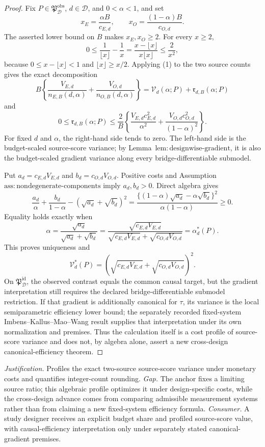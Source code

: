 \documentclass{article}
\begin{document}
\begin{proof}
Fix \(P\in\mathfrak P_{\mathcal D}^{\mathrm{obs}}\), \(d\in\mathcal D\), and \(0<\alpha<1\), and set
\[
 x_E=\frac{\alpha B}{c_{E,d}},\qquad
 x_O=\frac{(1-\alpha)B}{c_{O,d}}.
\]
The asserted lower bound on \(B\) makes \(x_E,x_O\ge2\). For every \(x\ge2\),
\[
 0\le \frac1{\lfloor x\rfloor}-\frac1x
 =\frac{x-\lfloor x\rfloor}{x\lfloor x\rfloor}
 \le\frac2{x^2}, \tag{1}
\]
because \(0\le x-\lfloor x\rfloor<1\) and \(\lfloor x\rfloor\ge x/2\). Applying (1) to the two source counts gives the exact decomposition
\[
 B\left\{\frac{V_{E,d}}{n_{E,B}(d,\alpha)}
 +\frac{V_{O,d}}{n_{O,B}(d,\alpha)}\right\}
 =\mathcal V_d(\alpha;P)+\mathfrak r_{d,B}(\alpha;P)
\]
and
\[
 0\le\mathfrak r_{d,B}(\alpha;P)
 \le\frac2B\left\{
 \frac{V_{E,d}c_{E,d}^2}{\alpha^2}
 +\frac{V_{O,d}c_{O,d}^2}{(1-\alpha)^2}\right\}. \tag{2}
\]
For fixed \(d\) and \(\alpha\), the right-hand side tends to zero. The left-hand side is the budget-scaled source-score variance; by Lemma~\(\mathrm{lem{:}designwise\text{-}gradient}\), it is also the budget-scaled gradient variance along every bridge-differentiable submodel.

Put \(a_d=c_{E,d}V_{E,d}\) and \(b_d=c_{O,d}V_{O,d}\). Positive costs and Assumption~\(\mathrm{ass{:}nondegenerate\text{-}components}\) imply \(a_d,b_d>0\). Direct algebra gives
\[
 \frac{a_d}{\alpha}+\frac{b_d}{1-\alpha}
 -(\sqrt{a_d}+\sqrt{b_d})^2
 =\frac{\{(1-\alpha)\sqrt{a_d}-\alpha\sqrt{b_d}\}^2}
 {\alpha(1-\alpha)}\ge0. \tag{3}
\]
Equality holds exactly when
\[
 \alpha=\frac{\sqrt{a_d}}{\sqrt{a_d}+\sqrt{b_d}}
 =\frac{\sqrt{c_{E,d}V_{E,d}}}
 {\sqrt{c_{E,d}V_{E,d}}+\sqrt{c_{O,d}V_{O,d}}}
 =\alpha_d^*(P).
\]
This proves uniqueness and
\[
 \mathcal V_d^*(P)
 =(\sqrt{c_{E,d}V_{E,d}}+\sqrt{c_{O,d}V_{O,d}})^2.
\]
On \(\mathfrak P_{\mathcal D}^{\mathrm{id}}\), the observed contrast equals the common causal target, but the gradient interpretation still requires the declared bridge-differentiable submodel restriction. If that gradient is additionally canonical for \(\tau\), its variance is the local semiparametric efficiency lower bound; the separately recorded fixed-system Imbens--Kallus--Mao--Wang result supplies that interpretation under its own normalization and premises. Thus the calculation itself is a cost profile of source-score variance and does not, by algebra alone, assert a new cross-design canonical-efficiency theorem.
\end{proof}
\par\smallskip\noindent \textit{Justification.} Profiles the exact two-source source-score variance under monetary costs and quantifies integer-count rounding. \textit{Gap.} The anchor fixes a limiting source ratio; this algebraic profile optimizes it under design-specific costs, while the cross-design advance comes from comparing admissible measurement systems rather than from claiming a new fixed-system efficiency formula. \textit{Consumer.} A study designer receives an explicit budget share and profiled source-score value, with causal-efficiency interpretation only under separately stated canonical-gradient premises.
\end{document}
